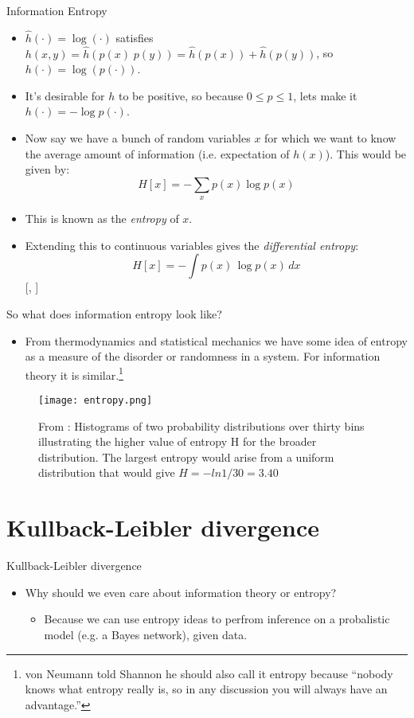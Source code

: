 \documentclass{beamer}
\begin{document}
\begin{frame}{Information Entropy}
\begin{itemize}
\item $\hat{h}(\cdot ) = \log ( \cdot )$ satisfies $h(x,y) = \hat{h}(p(x)\; p(y)) = \hat{h}(p(x)) + \hat{h}(p(y))$, so $h(\cdot ) = \log(p(\cdot ))$.
\item It's desirable for $h$ to be positive, so because $0 \leq p \leq 1$, lets make it $h(\cdot ) = -\log p(\cdot )$.
\item Now say we have a bunch of random variables $x$ for which we want to know the average amount of information (i.e. expectation of $h(x)$). This would be given by:
  \[H[x] = - \sum_x p(x) \log p(x) \]
\item This is known as the \textit{entropy} of $x$.
\item Extending this to continuous variables gives the \textit{differential entropy}:
  \[H[x] = - \int p(x)\, \log p(x)\, dx\][\cite{bishop}, \cite{shannon1948}]
\end{itemize}
\end{frame}

\begin{frame}{So what does information entropy look like?}
\begin{itemize}
\item From thermodynamics and statistical mechanics we have some idea of entropy as a measure of the disorder or randomness in a system. For information theory it is similar.\footnote{von Neumann told Shannon he should also call it entropy because ``nobody knows what entropy really is, so in any discussion you will always have an advantage.''}
\end{itemize}

\begin{figure}
\texttt{[image: entropy.png]}
\caption{\label{fig:entropy}From \cite{bishop}: Histograms of two probability distributions over thirty bins illustrating the higher value of entropy H for the broader distribution. The largest entropy would arise from a uniform distribution that would give $H = -ln 1/30 = 3.40$}
\end{figure}

\end{frame}


\section{Kullback-Leibler divergence}
\begin{frame}{Kullback-Leibler divergence}
\begin{itemize}
\item Why should we even care about information theory or entropy?
  \begin{itemize}
  \item Because we can use entropy ideas to perfrom inference on a probalistic model (e.g. a Bayes network), given data.
  \end{itemize}
\end{itemize}
\end{frame}
\end{document}
